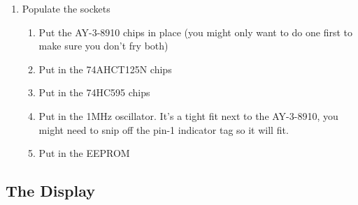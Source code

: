 \documentclass[11pt]{article}
\begin{document}
\begin{enumerate}
\item Populate the sockets
	\begin{enumerate}
		\item Put the AY-3-8910 chips in place 
			(you might only want to do one first
			to make sure you don't fry both)
		\item Put in the 74AHCT125N chips
		\item Put in the 74HC595 chips
		\item Put in the 1MHz oscillator.
			It's a tight fit next to the AY-3-8910,
			you might need to snip off the pin-1 indicator
			tag so it will fit.
		\item Put in the EEPROM
	\end{enumerate}
\end{enumerate}


		


\subsection{The Display}
\end{document}

